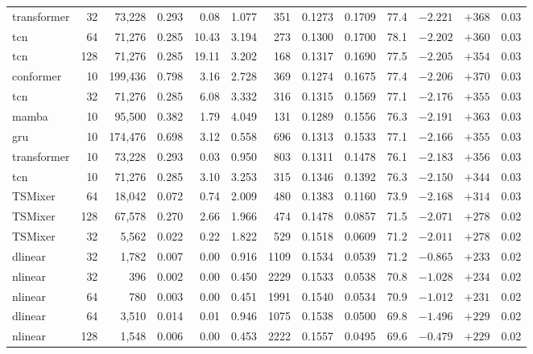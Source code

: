 \documentclass[
reprint,
aps,
prd,
superscriptaddress,
nofootinbib
]{revtex4-2}
\begin{document}
\begin{table}[ht]
\begin{tabular}{l r r r r r r r r r r r r}
transformer & 32  & 73{,}228 & 0.293 & 0.08 & 1.077 & 351  & 0.1273 & 0.1709 & 77.4 & $-2.221$ & $+368$ & 0.03 \\
tcn         & 64  & 71{,}276 & 0.285 & 10.43 & 3.194 & 273  & 0.1300 & 0.1700 & 78.1 & $-2.202$ & $+360$ & 0.03 \\
tcn         & 128 & 71{,}276 & 0.285 & 19.11 & 3.202 & 168  & 0.1317 & 0.1690 & 77.5 & $-2.205$ & $+354$ & 0.03 \\
conformer   & 10  & 199{,}436 & 0.798 & 3.16 & 2.728 & 369  & 0.1274 & 0.1675 & 77.4 & $-2.206$ & $+370$ & 0.03 \\
tcn         & 32  & 71{,}276 & 0.285 & 6.08 & 3.332 & 316  & 0.1315 & 0.1569 & 77.1 & $-2.176$ & $+355$ & 0.03 \\
mamba       & 10  & 95{,}500 & 0.382 & 1.79 & 4.049 & 131  & 0.1289 & 0.1556 & 76.3 & $-2.191$ & $+363$ & 0.03 \\
gru         & 10  & 174{,}476 & 0.698 & 3.12 & 0.558 & 696  & 0.1313 & 0.1533 & 77.1 & $-2.166$ & $+355$ & 0.03 \\
transformer & 10  & 73{,}228 & 0.293 & 0.03 & 0.950 & 803  & 0.1311 & 0.1478 & 76.1 & $-2.183$ & $+356$ & 0.03 \\
tcn         & 10  & 71{,}276 & 0.285 & 3.10 & 3.253 & 315  & 0.1346 & 0.1392 & 76.3 & $-2.150$ & $+344$ & 0.03 \\
TSMixer     & 64  & 18{,}042 & 0.072 & 0.74 & 2.009 & 480  & 0.1383 & 0.1160 & 73.9 & $-2.168$ & $+314$ & 0.03 \\
TSMixer     & 128 & 67{,}578 & 0.270 & 2.66 & 1.966 & 474  & 0.1478 & 0.0857 & 71.5 & $-2.071$ & $+278$ & 0.02 \\
TSMixer     & 32  & 5{,}562 & 0.022 & 0.22 & 1.822 & 529  & 0.1518 & 0.0609 & 71.2 & $-2.011$ & $+278$ & 0.02 \\
dlinear     & 32  & 1{,}782 & 0.007 & 0.00 & 0.916 & 1109 & 0.1534 & 0.0539 & 71.2 & $-0.865$ & $+233$ & 0.02 \\
nlinear     & 32  & 396 & 0.002 & 0.00 & 0.450 & 2229 & 0.1533 & 0.0538 & 70.8 & $-1.028$ & $+234$ & 0.02 \\
nlinear     & 64  & 780 & 0.003 & 0.00 & 0.451 & 1991 & 0.1540 & 0.0534 & 70.9 & $-1.012$ & $+231$ & 0.02 \\
dlinear     & 64  & 3{,}510 & 0.014 & 0.01 & 0.946 & 1075 & 0.1538 & 0.0500 & 69.8 & $-1.496$ & $+229$ & 0.02 \\
nlinear     & 128 & 1{,}548 & 0.006 & 0.00 & 0.453 & 2222 & 0.1557 & 0.0495 & 69.6 & $-0.479$ & $+229$ & 0.02 \\

\end{tabular}
\end{table}
\end{document}
